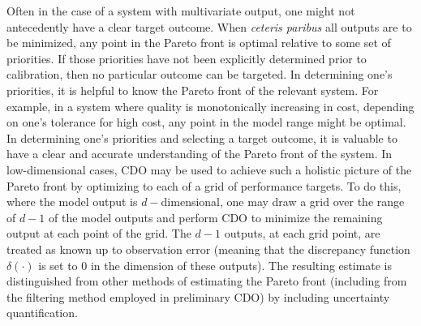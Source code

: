 \documentclass{article}
\begin{document}
Often in the case of a system with multivariate output, one might not antecedently have a clear target outcome.
%
When \textit{ceteris paribus} all outputs are to be minimized, any point in the Pareto front is optimal relative to some set of priorities.
%
If those priorities have not been explicitly determined prior to calibration, then no particular outcome can be targeted.
%
In determining one's priorities, it is helpful to know the Pareto front of the relevant system.
%
For example, in a system where quality is monotonically increasing in cost, depending on one's tolerance for high cost, any point in the model range might be optimal.
%
In determining one's priorities and selecting a target outcome, it is valuable to have a clear and accurate understanding of the Pareto front of the system.
%
In low-dimensional cases, CDO may be used to achieve such a holistic picture of the Pareto front by optimizing to each of a grid of performance targets.
%
%
%
%
%
To do this, where the model output is $d-$dimensional, one may draw a grid over the range of $d-1$ of the model outputs and perform CDO to minimize the remaining output at each point of the grid.
%
The $d-1$ outputs, at each grid point, are treated as known up to observation error (meaning that the discrepancy function $\delta(\cdot)$ is set to 0 in the dimension of these outputs).
%
The resulting estimate is distinguished from other methods of estimating the Pareto front (including from the filtering method employed in preliminary CDO) by including uncertainty quantification.
%
\end{document}
